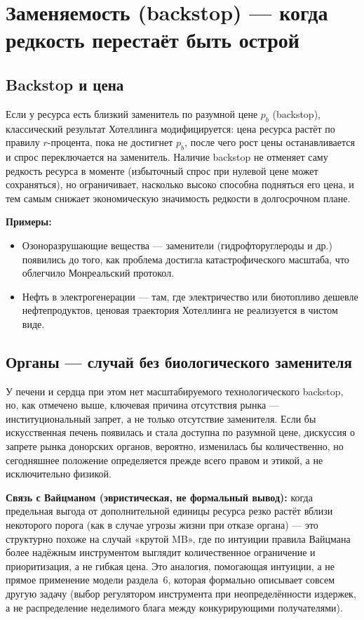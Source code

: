 \documentclass[11pt]{article}
\begin{document}
\section{Заменяемость (backstop) — когда редкость перестаёт быть острой}

\subsection{Backstop и цена}
Если у ресурса есть близкий заменитель по разумной цене $p_b$ (backstop), классический результат Хотеллинга модифицируется: цена ресурса растёт по правилу $r$-процента, пока не достигнет $p_b$, после чего рост цены останавливается и спрос переключается на заменитель. Наличие backstop не отменяет саму редкость ресурса в моменте (избыточный спрос при нулевой цене может сохраняться), но ограничивает, насколько высоко способна подняться его цена, и тем самым снижает экономическую значимость редкости в долгосрочном плане.

\textbf{Примеры:}
\begin{itemize}
\item Озоноразрушающие вещества — заменители (гидрофторуглероды и др.) появились до того, как проблема достигла катастрофического масштаба, что облегчило Монреальский протокол.
\item Нефть в электрогенерации — там, где электричество или биотопливо дешевле нефтепродуктов, ценовая траектория Хотеллинга не реализуется в чистом виде.
\end{itemize}

\subsection{Органы — случай без биологического заменителя}
У печени и сердца при этом нет масштабируемого технологического backstop, но, как отмечено выше, ключевая причина отсутствия рынка — институциональный запрет, а не только отсутствие заменителя. Если бы искусственная печень появилась и стала доступна по разумной цене, дискуссия о запрете рынка донорских органов, вероятно, изменилась бы количественно, но сегодняшнее положение определяется прежде всего правом и этикой, а не исключительно физикой.

\textbf{Связь с Вайцманом (эвристическая, не формальный вывод):} когда предельная выгода от дополнительной единицы ресурса резко растёт вблизи некоторого порога (как в случае угрозы жизни при отказе органа) — это структурно похоже на случай «крутой MB», где по интуиции правила Вайцмана более надёжным инструментом выглядит количественное ограничение и приоритизация, а не гибкая цена. Это аналогия, помогающая интуиции, а не прямое применение модели раздела~6, которая формально описывает совсем другую задачу (выбор регулятором инструмента при неопределённости издержек, а не распределение неделимого блага между конкурирующими получателями).
\end{document}
